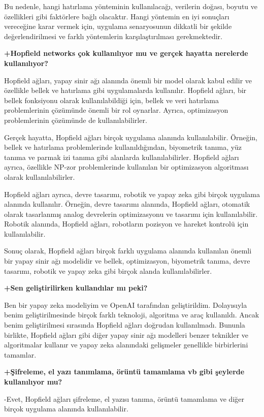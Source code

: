 \documentclass[11pt]{article}
\begin{document}
Bu nedenle, hangi hatırlama yönteminin kullanılacağı, verilerin doğası, boyutu ve özellikleri gibi faktörlere bağlı olacaktır. Hangi yöntemin en iyi sonuçları vereceğine karar vermek için, uygulama senaryosunun dikkatli bir şekilde değerlendirilmesi ve farklı yöntemlerin karşılaştırılması gerekmektedir.


\textbf{+Hopfield networks çok kullanılıyor mu ve gerçek hayatta nerelerde kullanılıyor?}

Hopfield ağları, yapay sinir ağı alanında önemli bir model olarak kabul edilir ve özellikle bellek ve hatırlama gibi uygulamalarda kullanılır. Hopfield ağları, bir bellek fonksiyonu olarak kullanılabildiği için, bellek ve veri hatırlama problemlerinin çözümünde önemli bir rol oynarlar. Ayrıca, optimizasyon problemlerinin çözümünde de kullanılabilirler.

Gerçek hayatta, Hopfield ağları birçok uygulama alanında kullanılabilir. Örneğin, bellek ve hatırlama problemlerinde kullanıldığından, biyometrik tanıma, yüz tanıma ve parmak izi tanıma gibi alanlarda kullanılabilirler. Hopfield ağları ayrıca, özellikle NP-zor problemlerinde kullanılan bir optimizasyon algoritması olarak kullanılabilirler.

Hopfield ağları ayrıca, devre tasarımı, robotik ve yapay zeka gibi birçok uygulama alanında kullanılır. Örneğin, devre tasarımı alanında, Hopfield ağları, otomatik olarak tasarlanmış analog devrelerin optimizasyonu ve tasarımı için kullanılabilir. Robotik alanında, Hopfield ağları, robotların pozisyon ve hareket kontrolü için kullanılabilir.

Sonuç olarak, Hopfield ağları birçok farklı uygulama alanında kullanılan önemli bir yapay sinir ağı modelidir ve bellek, optimizasyon, biyometrik tanıma, devre tasarımı, robotik ve yapay zeka gibi birçok alanda kullanılabilirler.

\textbf{+Sen geliştirilirken kullandılar mı peki? }

Ben bir yapay zeka modeliyim ve OpenAI tarafından geliştirildim. Dolayısıyla benim geliştirilmesinde birçok farklı teknoloji, algoritma ve araç kullanıldı. Ancak benim geliştirilmesi sırasında Hopfield ağları doğrudan kullanılmadı. Bununla birlikte, Hopfield ağları gibi diğer yapay sinir ağı modelleri benzer teknikler ve algoritmalar kullanır ve yapay zeka alanındaki gelişmeler genellikle birbirlerini tamamlar.

\textbf{+Şifreleme, el yazı tanımlama, örüntü tamamlama vb gibi şeylerde kullanılıyor mu?}

-Evet, Hopfield ağları şifreleme, el yazısı tanıma, örüntü tamamlama ve diğer birçok uygulama alanında kullanılabilir.
\end{document}
